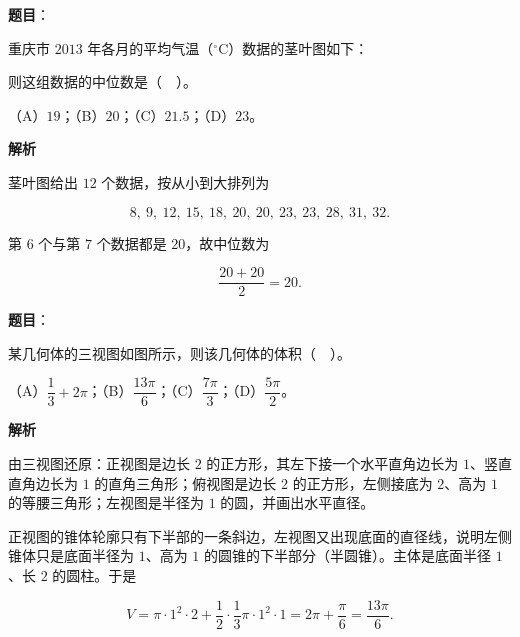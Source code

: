 \begin{answer}

\textbf{题目}：

重庆市 $2013$ 年各月的平均气温（$^\circ$C）数据的茎叶图如下：
\nopagebreak[4]
\begin{center}\end{center}
\nopagebreak[4]
则这组数据的中位数是（　）。

（A）$19$；（B）$20$；（C）$21.5$；（D）$23$。

\textbf{解析}

茎叶图给出 $12$ 个数据，按从小到大排列为

\nopagebreak[4]
\[
8,\ 9,\ 12,\ 15,\ 18,\ 20,\ 20,\ 23,\ 23,\ 28,\ 31,\ 32.
\]

第 $6$ 个与第 $7$ 个数据都是 $20$，故中位数为

\nopagebreak[4]
\[
\frac{20+20}{2}=20.
\]


\end{answer}
\begin{answer}

\textbf{题目}：

某几何体的三视图如图所示，则该几何体的体积（　）。
\nopagebreak[4]
\begin{center}\end{center}
\nopagebreak[4]
（A）$\dfrac{1}{3}+2\pi$；（B）$\dfrac{13\pi}{6}$；（C）$\dfrac{7\pi}{3}$；（D）$\dfrac{5\pi}{2}$。

\textbf{解析}

由三视图还原：正视图是边长 $2$ 的正方形，其左下接一个水平直角边长为 $1$、竖直直角边长为 $1$ 的直角三角形；俯视图是边长 $2$ 的正方形，左侧接底为 $2$、高为 $1$ 的等腰三角形；左视图是半径为 $1$ 的圆，并画出水平直径。

正视图的锥体轮廓只有下半部的一条斜边，左视图又出现底面的直径线，说明左侧锥体只是底面半径为 $1$、高为 $1$ 的圆锥的下半部分（半圆锥）。主体是底面半径 $1$、长 $2$ 的圆柱。于是

\nopagebreak[4]
\[
V=\pi\cdot 1^{2}\cdot 2+\frac{1}{2}\cdot\frac{1}{3}\pi\cdot 1^{2}\cdot 1
=2\pi+\frac{\pi}{6}
=\frac{13\pi}{6}.
\]


\end{answer}
